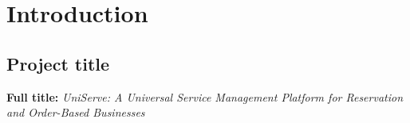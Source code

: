 \documentclass[]{VUMIFTemplateClass}
\newcommand{\yellowcomment}[1]{%
    \begin{tcolorbox}[colback=yellow!80, colframe=yellow!80, arc=0pt, outer arc=0pt, boxrule=0pt, left=3pt, right=3pt, top=3pt, bottom=3pt]
        \textbf{\textcolor{red}{COMMENT:}} #1
    \end{tcolorbox}
}
\newcommand{\warningcomment}[1]{%
    \begin{tcolorbox}[colback=yellow!90, colframe=red, arc=0pt, outer arc=0pt, boxrule=2pt, left=5pt, right=5pt, top=5pt, bottom=5pt]
        \Large\textbf{\textcolor{red}{FIX THIS: }} \normalsize #1
    \end{tcolorbox}
}
\newcommand{\goodcomment}[1]{%
    \begin{tcolorbox}[colback=green!20, colframe=green!60, arc=0pt, outer arc=0pt, boxrule=1pt, left=3pt, right=3pt, top=3pt, bottom=3pt]
        \textbf{\textcolor{green!70!black}{GOOD:}} #1
    \end{tcolorbox}
}
\newcommand{\noticecomment}[1]{%
    \begin{tcolorbox}[colback=blue!20, colframe=blue!60, arc=0pt, outer arc=0pt, boxrule=1pt, left=3pt, right=3pt, top=3pt, bottom=3pt]
        \textbf{\textcolor{blue!70!black}{NOTE:}} #1
    \end{tcolorbox}
}
\newcommand{\todocomment}[1]{%
    \begin{tcolorbox}[colback=red!20, colframe=red!60, arc=0pt, outer arc=0pt, boxrule=1pt, left=3pt, right=3pt, top=3pt, bottom=3pt]
        \textbf{\textcolor{orange!70!black}{TODO:}} #1
    \end{tcolorbox}
}
\newcommand{\suggestioncomment}[1]{%
    \definecolor{lime}{RGB}{50,205,50}%
    \begin{tcolorbox}[colback=lime!15, colframe=lime!60, arc=0pt, outer arc=0pt, boxrule=1pt, left=3pt, right=3pt, top=3pt, bottom=3pt]
        \textbf{\textcolor{lime!70!black}{SUGGESTION:}} #1
    \end{tcolorbox}%
}
\begin{document}








\section{Introduction}
\subsection{Project title}

\textbf{Full title:} \textit{UniServe: A Universal Service Management Platform for Reservation and Order-Based Businesses}
\end{document}
